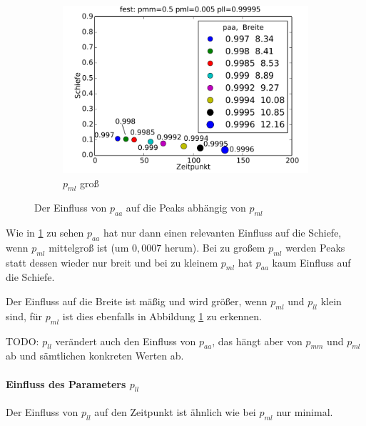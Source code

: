 \begin{figure}
\begin{subfigure}{0.6\textwidth}
\includegraphics[width=\textwidth]{bilder/paa/3fest_05_0005_p_099995}
\caption{$p_{ml}$ groß}
\end{subfigure}
\caption{Der Einfluss von $p_{aa}$ auf die Peaks abhängig von $p_{ml}$}
\label{einfluss_paa_pml}
\end{figure}

Wie in \ref{einfluss_paa_pml} zu sehen $p_{aa}$ hat nur dann einen relevanten Einfluss auf die Schiefe, wenn $p_{ml}$ mittelgroß ist (um $0,0007$ herum). Bei zu großem $p_{ml}$ werden Peaks statt dessen wieder nur breit und bei zu kleinem $p_{ml}$ hat $p_{aa}$ kaum Einfluss auf die Schiefe. 

Der Einfluss auf die Breite ist mäßig und wird größer, wenn $p_{ml}$ und $p_{ll}$ klein sind, für $p_{ml}$ ist dies ebenfalls in Abbildung \ref{einfluss_paa_pml} zu erkennen.

TODO: $p_{ll}$ verändert auch den Einfluss von $p_{aa}$, das hängt aber von $p_{mm}$ und $p_{ml}$ ab und sämtlichen konkreten Werten ab.

\paragraph*{Einfluss des Parameters $p_{ll}$}

Der Einfluss von $p_{ll}$ auf den Zeitpunkt ist ähnlich wie bei $p_{ml}$ nur minimal.

